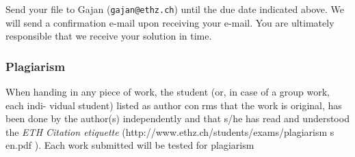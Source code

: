 \documentclass[uebung]{ETHIDSCprogramming_dpoc}
\begin{document}
Send your file to Gajan ({\tt gajan@ethz.ch}) until the due date indicated above.  We will send a confirmation e-mail upon receiving your e-mail.  You are ultimately responsible that we receive your solution in time.


\subsubsection*{Plagiarism}
When handing in any piece of work, the student (or, in case of a group work, each indi-
vidual student) listed as author conrms that the work is original, has been done by the
author(s) independently and that s/he has read and understood the \textit{ETH Citation etiquette}
(http://www.ethz.ch/students/exams/plagiarism s en.pdf ). Each work submitted will be tested
for plagiarism
\end{document}
